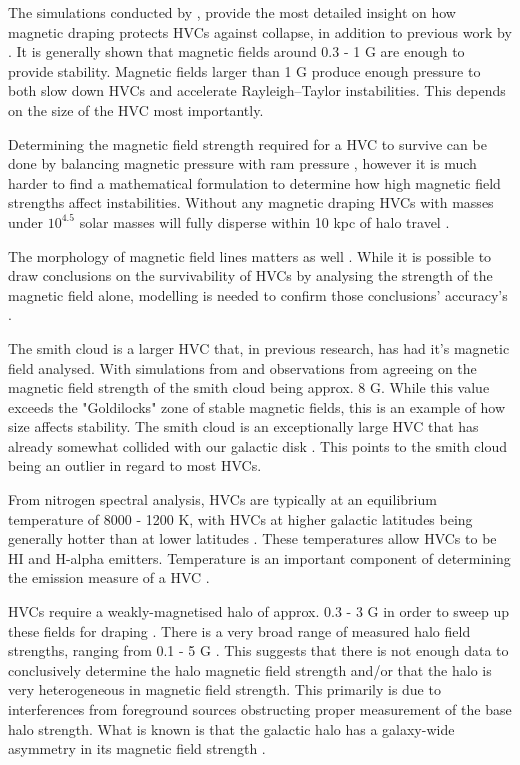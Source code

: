 The simulations conducted by \citep{ID23, ID24, ID33}, provide the most detailed insight on how magnetic draping protects HVCs against collapse, in addition to previous work by \citep{ID11, ID13, ID25}. It is generally shown that magnetic fields around 0.3 - 1 {\textmu}G are enough to provide stability. Magnetic fields larger than 1 {\textmu}G produce enough pressure to both slow down HVCs and accelerate Rayleigh–Taylor instabilities. This depends on the size of the HVC most importantly.

Determining the magnetic field strength required for a HVC to survive can be done by balancing magnetic pressure with ram pressure \cite{ID13}, however it is much harder to find a mathematical formulation to determine how high magnetic field strengths affect instabilities. Without any magnetic draping HVCs with masses under $10^4.5$ solar masses will fully disperse within 10 kpc of halo travel \cite{ID25}.

The morphology of magnetic field lines matters as well \cite{ID24}. While it is possible to draw conclusions on the survivability of HVCs by analysing the strength of the magnetic field alone, modelling is needed to confirm those conclusions' accuracy's \cite{ID5}.

The smith cloud is a larger HVC that, in previous research, has had it's magnetic field analysed. With simulations from \citep{ID23} and observations from \citep{ID28} agreeing on the magnetic field strength of the smith cloud being approx. 8 {\textmu}G. While this value exceeds the "Goldilocks" zone of stable magnetic fields, this is an example of how size affects stability. The smith cloud is an exceptionally large HVC that has already somewhat collided with our galactic disk \cite{ID28, ID35}. This points to the smith cloud being an outlier in regard to most HVCs.

From nitrogen spectral analysis, HVCs are typically at an equilibrium temperature of 8000 - 1200 K, with HVCs at higher galactic latitudes being generally hotter than at lower latitudes \cite{ID48, ID49}. These temperatures allow HVCs to be HI and H-alpha emitters. Temperature is an important component of determining the emission measure of a HVC \cite{ID5, ID26, ID30}.

HVCs require a weakly-magnetised halo of approx. 0.3 - 3 {\textmu}G in order to sweep up these fields for draping \cite{ID13}. There is a very broad range of measured halo field strengths, ranging from 0.1 - 5 {\textmu}G \cite{ID4, ID16, ID21, ID30, ID37, ID42}. This suggests that there is not enough data to conclusively determine the halo magnetic field strength and/or that the halo is very heterogeneous in magnetic field strength. This primarily is due to interferences from foreground sources obstructing proper measurement of the base halo strength. What is known is that the galactic halo has a galaxy-wide asymmetry in its magnetic field strength \cite{ID16, ID30, ID21}.

